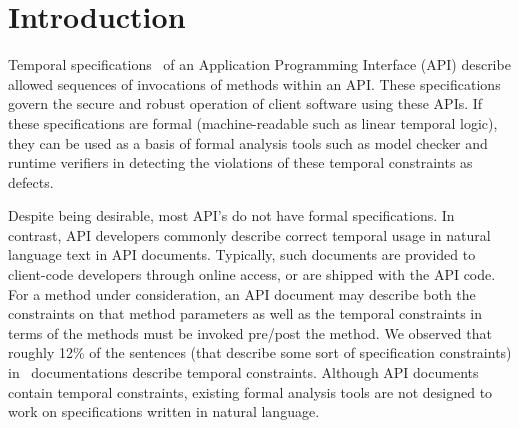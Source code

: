 \section{Introduction}
\label{sec:introduction}





Temporal specifications~\cite{ball2002s} of an Application Programming Interface (API) 
describe allowed sequences of invocations of methods within an API. 
These specifications govern the secure and robust operation of client software 
using these APIs.
If these specifications are formal (machine-readable such as linear temporal logic),
they can be used  as a basis of formal analysis tools such 
as model checker and runtime verifiers
in detecting the violations of these temporal constraints as defects.





Despite being desirable, most API's do not have formal specifications.
In contrast, API developers commonly describe correct temporal usage in natural language text in API documents.
Typically, such documents are provided to client-code developers through online access, or are shipped with the API code.
For a method under consideration, an API document may describe both the constraints on that method parameters as well as the temporal constraints in terms of the methods must be invoked pre/post the method.
We observed that roughly 12\% of the sentences (that describe some sort of specification constraints) in \amazonAPI\ documentations describe temporal constraints.
Although API documents contain temporal constraints, existing formal analysis tools are not designed to work on specifications written in natural language.

